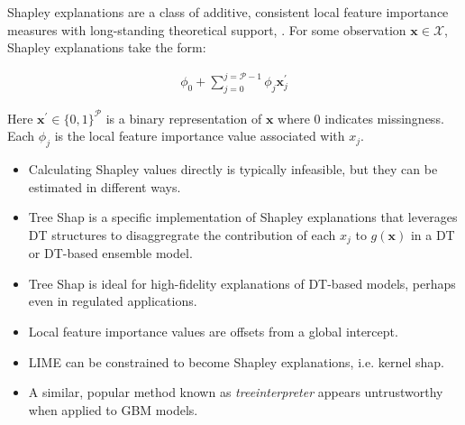 \documentclass{article}
\begin{document}
Shapley explanations are a class of additive, consistent local feature importance measures with long-standing theoretical support, \cite{shapley}. For some observation $\mathbf{x} \in \mathcal{X}$, Shapley explanations take the form:

\vspace{-5pt}

\begin{equation}
\begin{aligned}
\phi_0 + \sum_{j=0}^{j=\mathcal{P} - 1} \phi_j \mathbf{x}_j^\prime
\end{aligned}
\end{equation}

Here $\mathbf{x}^\prime \in \{0,1\}^\mathcal{P}$ is a binary representation of $\mathbf{x}$ where 0 indicates missingness. Each $\phi_j$ is the local feature importance value associated with $x_j$.

\begin{itemize}
	
	\item Calculating Shapley values directly is typically infeasible, but they can be estimated in different ways.
	
	\item Tree Shap is a specific implementation of Shapley explanations that leverages DT structures to disaggregrate the contribution of each $x_j$ to $g(\mathbf{x})$ in a DT or DT-based ensemble model. \cite{tree_shap}
	
\end{itemize}

\begin{itemize}
	
	\item Tree Shap is ideal for high-fidelity explanations of DT-based models, perhaps even in regulated applications.
	
	\item Local feature importance values are offsets from a global intercept.
	
	\item LIME can be constrained to become Shapley explanations, i.e. kernel shap.
	
	\item A similar, popular method known as \textit{treeinterpreter} appears untrustworthy when applied to GBM models. 
	
\end{itemize}

\end{document}
